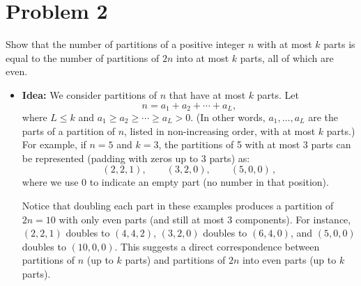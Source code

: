 \documentclass[docmute]{article}
\begin{document}
\vspace{1em} %

\section{Problem 2} Show that the number of partitions of a positive integer $n$ with at most $k$ parts is equal to the number of partitions of $2n$ into at most $k$ parts, all of which are even.

\begin{itemize}
  \item \textbf{Idea:} We consider partitions of $n$ that have at most $k$ parts. Let 
  \[
    n = a_1 + a_2 + \cdots + a_L,
  \] 
  where $L \le k$ and $a_1 \ge a_2 \ge \cdots \ge a_L > 0$. (In other words, $a_1,\ldots,a_L$ are the parts of a partition of $n$, listed in non-increasing order, with at most $k$ parts.) For example, if $n=5$ and $k=3$, the partitions of 5 with at most 3 parts can be represented (padding with zeros up to 3 parts) as:
  \[
    (2,2,1), \qquad (3,2,0), \qquad (5,0,0)\,,
  \] 
  where we use $0$ to indicate an empty part (no number in that position).
  
  Notice that doubling each part in these examples produces a partition of $2n=10$ with only even parts (and still at most 3 components). For instance, $(2,2,1)$ doubles to $(4,4,2)$, $(3,2,0)$ doubles to $(6,4,0)$, and $(5,0,0)$ doubles to $(10,0,0)$. This suggests a direct correspondence between partitions of $n$ (up to $k$ parts) and partitions of $2n$ into even parts (up to $k$ parts).
  

\end{itemize}
\end{document}
